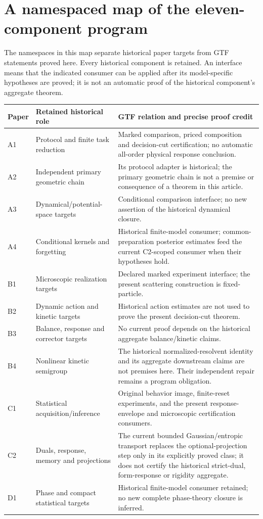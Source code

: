 \clearpage
\section{A namespaced map of the eleven-component program}
\label{sec:v20-program}
The namespaces in this map separate historical paper targets from GTF
statements proved here. Every historical component is retained. An
interface means that the indicated consumer can be applied after its
model-specific hypotheses are proved; it is not an automatic proof of
the historical component's aggregate theorem.
\begin{center}
\small
\begin{tabular}{p{}p{}p{}}
\toprule
Paper & Retained historical role & GTF relation and precise proof credit\\
\midrule
A1 & Protocol and finite task reduction & Marked comparison, priced
composition and decision-cut certification; no automatic all-order
physical response conclusion.\\[3pt]
A2 & Independent primary geometric chain & Its protocol adapter is
historical; the primary geometric chain is not a premise or consequence
of a theorem in this article.\\[3pt]
A3 & Dynamical/potential-space targets & Conditional comparison interface;
no new assertion of the historical dynamical closure.\\[3pt]
A4 & Conditional kernels and forgetting & Historical finite-model consumer;
common-preparation posterior estimates feed the current C2-scoped
consumer when their hypotheses hold.\\[3pt]
B1 & Microscopic realization targets & Declared marked experiment
interface; the present scattering construction is fixed-particle.\\[3pt]
B2 & Dynamic action and kinetic targets & Historical action estimates are
not used to prove the present decision-cut theorem.\\[3pt]
B3 & Balance, response and corrector targets & No current proof depends
on the historical aggregate balance/kinetic claims.\\[3pt]
B4 & Nonlinear kinetic semigroup & The historical normalized-resolvent
identity and its aggregate downstream claims are not premises here.
Their independent repair remains a program obligation.\\[3pt]
C1 & Statistical acquisition/inference & Original behavior image,
finite-reset experiments, and the present response-envelope and
microscopic certification consumers.\\[3pt]
C2 & Duals, response, memory and projections & The current bounded
Gaussian/entropic transport replaces the optional-projection step only
in its explicitly proved class; it does not certify the historical
strict-dual, form-response or rigidity aggregate.\\[3pt]
D1 & Phase and compact statistical targets & Historical finite-model
consumer retained; no new complete phase-theory closure is inferred.\\
\bottomrule
\end{tabular}
\end{center}
